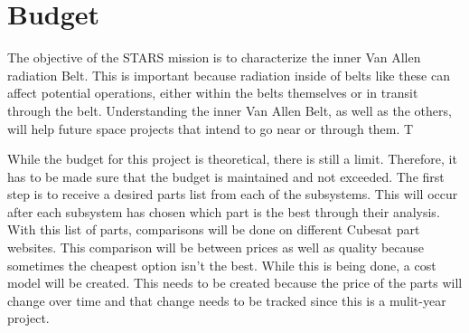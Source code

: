 
\section{Budget}
The objective of the STARS mission is to characterize the inner Van Allen radiation Belt. This is important because radiation inside of belts like these can affect potential operations, either within the belts themselves or in transit through the belt. Understanding the inner Van Allen Belt, as well as the others, will help future space projects that intend to go near or through them. T

While the budget for this project is theoretical, there is still a limit. Therefore, it has to be made sure that the budget is maintained and not exceeded. The first step is to receive a desired parts list from each of the subsystems. This will occur after each subsystem has chosen which part is the best through their analysis. With this list of parts, comparisons will be done on different Cubesat part websites. This comparison will be between prices as well as quality because sometimes the cheapest option isn't the best. While this is being done, a cost model will be created. This needs to be created because the price of the parts will change over time and that change needs to be tracked since this is a mulit-year project. 